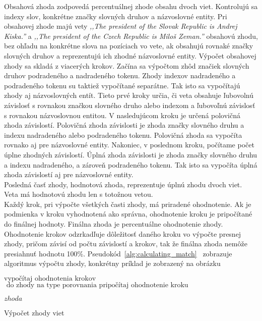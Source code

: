 Obsahová zhoda zodpovedá percentuálnej zhode obsahu dvoch viet. Kontrolujú sa indexy slov, konkrétne značky slovných druhov a názvoslovné entity. Pri obsahovej zhode majú vety \textit{,,The president of the Slovak Republic is Andrej Kiska.''} a \textit{,,The president of the Czech Republic is Miloš Zeman.''} obsahovú zhodu, bez ohľadu na konkrétne slova na pozíciach vo vete, ak obsahujú rovnaké značky slovných druhov a reprezentujú ich zhodné názvoslovné entity. Výpočet obsahovej zhody sa skladá z viacerých krokov. Začína sa výpočtom zhôd značiek slovných druhov podradeného a nadradeného tokenu. Zhody indexov nadradeného a podradeného tokenu su taktiež vypočítané separátne. Tak isto sa vypočítajú zhody aj názvoslovných entít. Tieto prvé kroky určia, či veta obsahuje ľubovolnú závislosť s rovnakou značkou slovného druho alebo indexom a ľubovoľnú závislosť s rovnakou názvoslovnou entitou. V nasledujúcom kroku je určená polovičná zhoda závislostí. Polovičná zhoda závislosti je zhoda značky slovného druhu a indexu nadradeného alebo podradeného tokenu. Polovičná zhoda sa vypočíta rovnako aj pre názvoslovné entity. Nakoniec, v poslednom kroku, počítame počet úplne zhodných závislostí. Úplná zhoda závislosti je zhoda značky slovného druhu a indexu nadradeného, a zároveň podradeného tokenu. Tak isto sa vypočíta úplná zhoda závislostí aj pre názvoslovné entity. \\

Posledná časť zhody, hodnotová zhoda, reprezentuje úplnú zhodu dvoch viet. Veta má hodnotovú zhodu len s totožnou vetou. \\

Každý krok, pri výpočte všetkých časti zhody, má priradené ohodnotenie. Ak je podmienka v kroku vyhodnotená ako správna, ohodnotenie kroku je pripočítané do finálnej hodnoty. Finálna zhoda je percentuálne ohodnotenie zhody. Ohodnotenie krokov odzrkadľuje dôležitosť daného kroku vo výpočte presnej zhody, pričom závisí od počtu závislostí a krokov, tak že finálna zhoda nemôže presiahnuť hodnotu 100\%. Pseudokód~\ref{alg:calculating_match}~ zobrazuje algoritmus výpočtu zhody, konkrétny príklad je zobrazený na obrázku~

\begin{algorithm}[H]
	\footnotesize %
	\begin{algorithmic}[1]

		\State $\text{vypočítaj ohodnotenia krokov}$
		\State $\text{ do zhody na type porovnania pripočítaj ohodnotenie kroku}$
		\EndIf
		\EndFor
		\EndFor
		\EndFor
		
		\Return $zhoda$
		\EndProcedure
	\end{algorithmic}
	\caption[Výpočet zhody viet]{Výpočet zhody viet}	
	\label{alg:calculating_match}
\end{algorithm}

